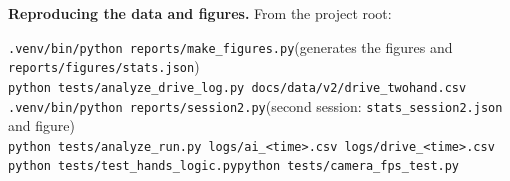 \documentclass[11pt,a4paper]{article}
\newcommand{\code}[1]{\texttt{\small #1}}
\begin{document}
\textbf{Reproducing the data and figures.} From the project root:
\begin{center}\small
\code{.venv/bin/python reports/make\_figures.py}\quad (generates the figures and \code{reports/figures/stats.json})\\
\code{python tests/analyze\_drive\_log.py docs/data/v2/drive\_twohand.csv}\\
\code{.venv/bin/python reports/session2.py}\quad (second session: \code{stats\_session2.json} and figure)\\
\code{python tests/analyze\_run.py logs/ai\_<time>.csv logs/drive\_<time>.csv}\\
\code{python tests/test\_hands\_logic.py}\quad \code{python tests/camera\_fps\_test.py}
\end{center}
\end{document}
